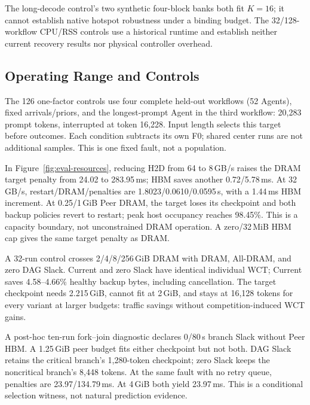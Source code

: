 The long-decode control's two synthetic four-block banks both fit $K=16$;
it cannot establish native hotspot robustness under a binding budget.
The 32/128-workflow CPU/RSS controls use a historical runtime and establish
neither current recovery results nor physical controller overhead.

\subsection{Operating Range and Controls}
\label{sec:eval-sensitivity}
The 126 one-factor controls use four complete held-out workflows (52 Agents),
fixed arrivals/priors, and the longest-prompt Agent in the third workflow:
20,283 prompt tokens, interrupted at token 16,228. Input length selects this
target before outcomes. Each condition subtracts its own F0; shared center
runs are not additional samples. This is one fixed fault, not a population.

In Figure~\ref{fig:eval-resources}, reducing H2D from 64 to 8\,GB/s raises the
DRAM target penalty from 24.02 to 283.95\,ms; HBM saves another 0.72/5.78\,ms.
At 32\,GB/s, restart/DRAM/\system penalties are 1.8023/0.0610/0.0595\,s,
with a 1.44\,ms HBM increment. At 0.25/1\,GiB Peer DRAM, the target loses its
checkpoint and both backup policies revert to restart; peak host occupancy
reaches 98.45\%. This is a capacity boundary, not unconstrained DRAM operation.
A zero/32\,MiB HBM cap gives the same target penalty as DRAM.

A 32-run control crosses 2/4/8/256\,GiB DRAM with DRAM, All-DRAM,
\system and zero DAG Slack. Current and zero Slack have identical individual
WCT; Current saves 4.58--4.66\% healthy backup bytes, including cancellation.
The target checkpoint needs 2.215\,GiB, cannot fit at 2\,GiB, and stays at
16,128 tokens for every variant at larger budgets: traffic savings without
competition-induced WCT gains.

A post-hoc ten-run fork--join diagnostic declares 0/80\,s branch Slack
without Peer HBM. A 1.25\,GiB peer budget fits either checkpoint but not both.
DAG Slack retains the critical branch's 1,280-token checkpoint; zero Slack
keeps the noncritical branch's 8,448 tokens. At the same fault with no retry
queue, penalties are 23.97/134.79\,ms. At 4\,GiB both yield 23.97\,ms.
This is a conditional selection witness, not natural prediction evidence.

